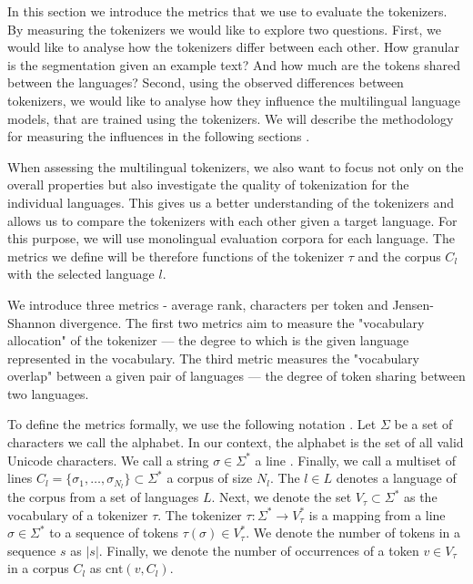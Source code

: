 In this section we introduce the metrics that we use to evaluate the tokenizers. By measuring the tokenizers we would like to explore two questions. First, we would like to analyse how the tokenizers differ between each other. How granular is the segmentation given an example text? And how much are the tokens shared between the languages? Second, using the observed differences between tokenizers, we would like to analyse how they influence the multilingual language models, that are trained using the tokenizers. We will describe the methodology for measuring the influences in the following sections .

When assessing the multilingual tokenizers, we also want to focus not only on the overall properties but also investigate the quality of tokenization for the individual languages. This gives us a better understanding of the tokenizers and allows us to compare the tokenizers with each other given a target language. For this purpose, we will use monolingual evaluation corpora for each language. The metrics we define will be therefore functions of the tokenizer $\tau$ and the corpus $C_l$ with the selected language $l$. 

We introduce three metrics - average rank, characters per token and Jensen-Shannon divergence. The first two metrics aim to measure the "vocabulary allocation" of the tokenizer --- the degree to which is the given language represented in the vocabulary. The third metric measures the "vocabulary overlap" between a given pair of languages --- the degree of token sharing between two languages.


To define the metrics formally, we use the following notation \cite{zouhar_tokenization_2023}. Let $\Sigma$ be a set of characters we call the alphabet. In our context, the alphabet is the set of all valid Unicode characters. We call a string $\sigma \in \Sigma^*$ a line . Finally, we call a multiset of lines $C_l = \{ \sigma_1, \ldots, \sigma_{N_l} \} \subset \Sigma^*$ a corpus of size $N_l$. The $l \in L$ denotes a language of the corpus from a set of languages $L$. Next, we denote the set $V_\tau \subset \Sigma^*$ as the vocabulary of a tokenizer $\tau$. The tokenizer $\tau: \Sigma^* \rightarrow V_\tau^*$ is a mapping from a line $\sigma \in \Sigma^*$ to a sequence of tokens $\tau(\sigma) \in V_\tau^*$. We denote the number of tokens in a sequence $s$ as $|s|$. Finally, we denote the number of occurrences of a token $v \in V_\tau$ in a corpus $C_l$ as $\textrm{cnt}(v, C_l)$.


